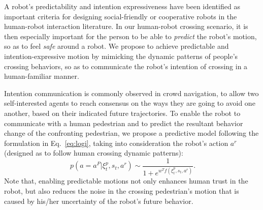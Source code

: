 \documentclass[conference]{IEEEtran}
\begin{document}

A robot's predictability and intention expressiveness have been identified
as important criteria for designing social-friendly or cooperative robots in 
the human-robot interaction literature. In our human-robot crossing scenario, 
it is then especially important for the person to be able to \textit{predict} 
the robot's motion, so as to feel \textit{safe} around a robot.
We  propose to achieve predictable and 
intention-expressive motion by mimicking the dynamic patterns of people's
crossing behaviors, so as to communicate
the robot's intention of crossing in a human-familiar manner.


Intention communication is commonly observed in crowd navigation, to allow two 
self-interested agents to reach 
consensus on the ways they are going to avoid one another, based on their 
indicated future trajectories. To enable the robot
to communicate with a human pedestrian and to predict the resultant behavior change of 
the confronting pedestrian, we propose a predictive model 
following the formulation in 
Eq.~\ref{eq:logi}, taking into consideration the robot's action $a^r$ (designed as 
to follow human crossing dynamic patterns):
\begin{equation}~\label{eq:transition}
p(a=a^P|\xi^p_t, s_t, a^r) \sim \frac{1}{1+e^{w^Tf(\xi^p_t,s_t,a^r)}}.
\end{equation}
Note that, enabling predictable motions not only enhances human trust in the 
robot, but also reduces the noise in the crossing pedestrian's motion that is 
caused by his/her uncertainty of the robot's future behavior.
\end{document}
